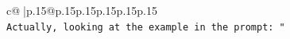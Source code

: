 \documentclass{article}
\begin{document}
{\begin{supertabular}{c@{$\;$}|p{.15\linewidth}@{}p{.15\linewidth}p{.15\linewidth}p{.15\linewidth}p{.15\linewidth}p{.15\linewidth}}
{{{\\ 
\texttt{Actually, looking at the example in the prompt: "} \\
            }
        }
    }
     \\ \\

\end{supertabular}
}
\end{document}
